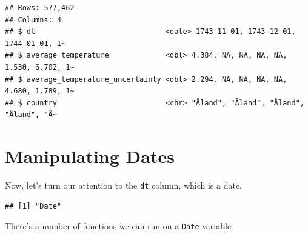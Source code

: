 \documentclass[
]{book}
\newenvironment{Shaded}{\begin{snugshade}}{\end{snugshade}}
\newcommand{\CommentTok}[1]{\textcolor[rgb]{0.56,0.35,0.01}{\textit{#1}}}
\newcommand{\DecValTok}[1]{\textcolor[rgb]{0.00,0.00,0.81}{#1}}
\newcommand{\KeywordTok}[1]{\textcolor[rgb]{0.13,0.29,0.53}{\textbf{#1}}}
\newcommand{\NormalTok}[1]{#1}
\newcommand{\OperatorTok}[1]{\textcolor[rgb]{0.81,0.36,0.00}{\textbf{#1}}}
\newcommand{\StringTok}[1]{\textcolor[rgb]{0.31,0.60,0.02}{#1}}
\begin{document}
\begin{Shaded}
\end{Shaded}

\begin{verbatim}
## Rows: 577,462
## Columns: 4
## $ dt                              <date> 1743-11-01, 1743-12-01, 1744-01-01, 1~
## $ average_temperature             <dbl> 4.384, NA, NA, NA, NA, 1.530, 6.702, 1~
## $ average_temperature_uncertainty <dbl> 2.294, NA, NA, NA, NA, 4.680, 1.789, 1~
## $ country                         <chr> "Åland", "Åland", "Åland", "Åland", "Å~
\end{verbatim}

\hypertarget{manipulating-dates}{%
\section{Manipulating Dates}\label{manipulating-dates}}

Now, let's turn our attention to the \texttt{dt} column, which is a date.

\begin{Shaded}
\end{Shaded}

\begin{verbatim}
## [1] "Date"
\end{verbatim}

There's a number of functions we can run on a \texttt{Date} variable.

\begin{Shaded}
\end{Shaded}
\end{document}
